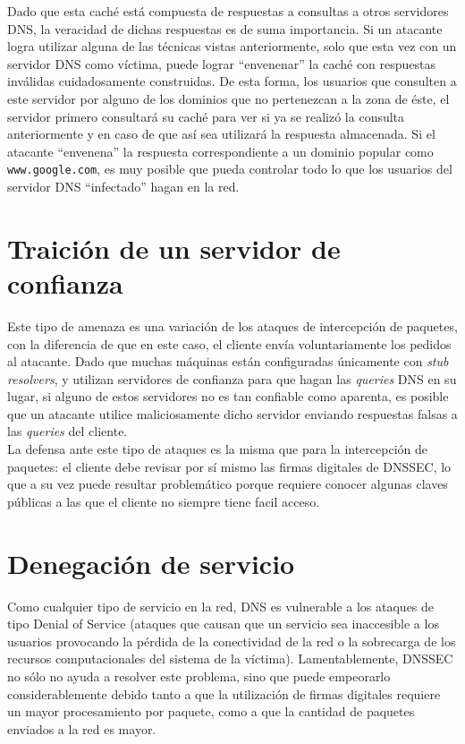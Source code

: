 Dado que esta cach\'e est\'a compuesta de respuestas a consultas a otros servidores DNS, la veracidad de dichas respuestas es de suma importancia. Si un atacante logra utilizar alguna de las t\'ecnicas vistas anteriormente, solo que esta vez con un servidor DNS como v\'ictima, puede lograr
``envenenar'' la cach\'e con respuestas inv\'alidas cuidadosamente construidas. De esta forma, los usuarios que consulten a este servidor por
alguno de los dominios que no pertenezcan a la zona de \'este, el servidor primero consultar\'a su cach\'e para ver si ya se realiz\'o la consulta
anteriormente y en caso de que as\'i sea utilizar\'a la respuesta almacenada. Si el atacante ``envenena'' la respuesta correspondiente a un
dominio popular como \texttt{www.google.com}, es muy posible que pueda controlar todo lo que los usuarios del servidor DNS ``infectado'' hagan en la red.

\section{Traici\'on de un servidor de confianza}
Este tipo de amenaza es una variaci\'on de los ataques de intercepci\'on de paquetes, con la diferencia de que en este caso, el cliente env\'ia voluntariamente los pedidos al atacante. Dado que muchas m\'aquinas est\'an configuradas \'unicamente con \textit{stub resolvers}, y utilizan servidores de confianza para que hagan las \textit{queries} DNS en su lugar, si alguno de estos servidores no es tan confiable como aparenta, es posible que un atacante utilice maliciosamente dicho servidor enviando respuestas falsas a las \textit{queries} del cliente.\\
La defensa ante este tipo de ataques es la misma que para la intercepci\'on de paquetes: el cliente debe revisar por s\'i mismo las firmas digitales de DNSSEC, lo que a su vez puede resultar problem\'atico porque requiere conocer algunas claves p\'ublicas a las que el cliente no siempre tiene facil acceso.


\section{Denegaci\'on de servicio}
Como cualquier tipo de servicio en la red, DNS es vulnerable a los ataques de tipo Denial of Service (ataques que causan que un servicio sea inaccesible a los usuarios provocando la p\'erdida de la conectividad de la red o la sobrecarga de los recursos computacionales del sistema de la v\'ictima\cite{dos06}). Lamentablemente, DNSSEC no s\'olo no ayuda a resolver este problema, sino que puede empeorarlo considerablemente debido tanto a que la utilizaci\'on de firmas digitales requiere un mayor procesamiento por paquete, como a que la cantidad de paquetes enviados a la red es mayor.


